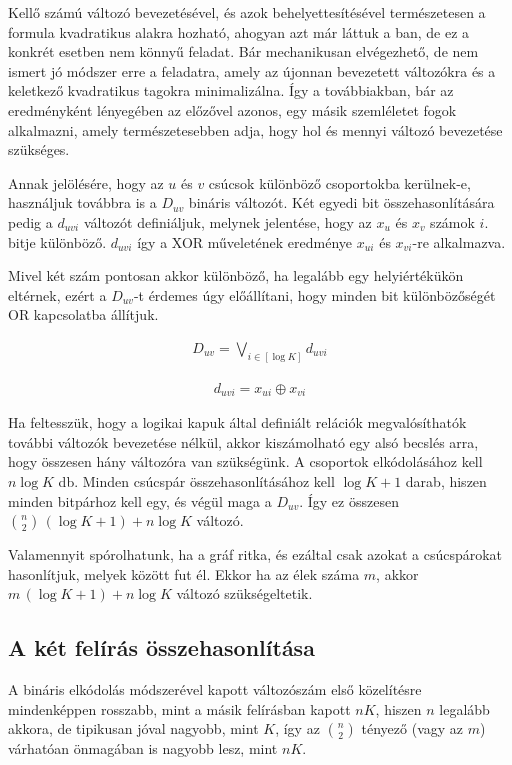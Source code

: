 Kellő számú változó bevezetésével, és azok behelyettesítésével természetesen a formula kvadratikus alakra hozható, ahogyan azt már láttuk a ban, de ez a konkrét esetben nem könnyű feladat. Bár mechanikusan elvégezhető, de nem ismert jó módszer erre a feladatra, amely az újonnan bevezetett változókra és a keletkező kvadratikus tagokra minimalizálna. Így a továbbiakban, bár az eredményként lényegében az előzővel azonos, egy másik szemléletet fogok alkalmazni, amely természetesebben adja, hogy hol és mennyi változó bevezetése szükséges.


Annak jelölésére, hogy az $u$ és $v$ csúcsok különböző csoportokba kerülnek-e, használjuk továbbra is a $D_{uv}$ bináris változót. Két egyedi bit összehasonlítására pedig a $d_{uvi}$ változót definiáljuk, melynek jelentése, hogy az $x_u$ és $x_v$ számok $i.$ bitje különböző. $d_{uvi}$ így a XOR műveletének eredménye $x_{ui}$ és  $x_{vi}$-re alkalmazva.

Mivel két szám pontosan akkor különböző, ha legalább egy helyiértékükön eltérnek, ezért a $D_{uv}$-t érdemes úgy előállítani, hogy minden bit különbözőségét OR kapcsolatba állítjuk.

\begin{align}
	D_{uv} = \bigvee_{i \in [ \log K ] }{d_{uvi}}
\end{align}

\begin{align}
	d_{uvi} = x_{ui} \oplus x_{vi}
\end{align}

Ha feltesszük, hogy a logikai kapuk által definiált relációk megvalósíthatók további változók bevezetése nélkül, akkor kiszámolható egy alsó becslés arra, hogy összesen hány változóra van szükségünk. A csoportok elkódolásához kell $n \log K$ db. Minden csúcspár összehasonlításához kell $\log K + 1$ darab, hiszen minden bitpárhoz kell egy, és végül maga a $D_{uv}$. Így ez összesen $\binom{n}{2} \, ( \log K + 1 ) + n\log K$ változó.

Valamennyit spórolhatunk, ha a gráf ritka, és ezáltal csak azokat a csúcspárokat hasonlítjuk, melyek között fut él. Ekkor ha az élek száma $m$, akkor $m \, ( \log K + 1 ) + n\log K$ változó szükségeltetik.

\subsection{A két felírás összehasonlítása}

A bináris elkódolás módszerével kapott változószám első közelítésre mindenképpen rosszabb, mint a másik felírásban kapott $nK$, hiszen $n$ legalább akkora, de tipikusan jóval nagyobb, mint $K$, így az $\binom{n}{2}$ tényező (vagy az $m$) várhatóan önmagában is nagyobb lesz, mint $nK$.

